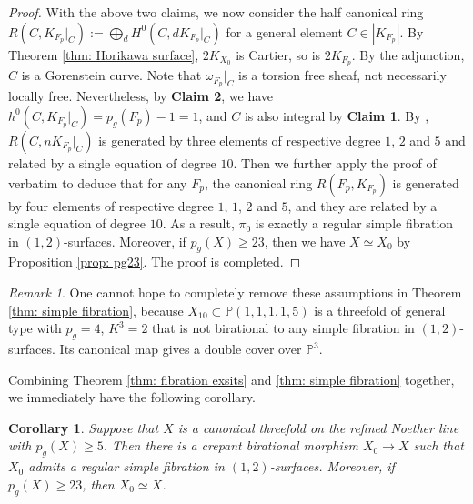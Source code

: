 \documentclass[a4paper,11pt]{amsart}
\newcommand{\PP}{\ensuremath{\mathbb{P}}}
\newtheorem{cor}[thm]{Corollary}
\theoremstyle{definition}
\theoremstyle{remark}
\newtheorem{remark}[thm]{Remark}
\numberwithin{equation}{section}
\begin{document}
\begin{proof}
	With the above two claims, we now consider the half canonical ring $R(C, K_{F_p}|_{C}) := \bigoplus_d H^0(C, dK_{F_p}|_C)$ for a general element $C \in |K_{F_p}|$. By Theorem \ref{thm: Horikawa surface}, $2K_{X_0}$ is Cartier, so is $2K_{F_p}$. By the adjunction, $C$ is a Gorenstein curve. Note that $\omega_{F_p}|_C$ is a torsion free sheaf, not necessarily locally free. Nevertheless, by \textbf{Claim 2}, we have $h^0(C, K_{F_p}|_C) = p_g(F_p) - 1 = 1$, and $C$ is also integral by \textbf{Claim 1}. By \cite[Theorem 5.2]{CFPR}, $R(C, nK_{F_p}|_{C})$ is generated by three elements of respective degree $1$, $2$ and $5$ and related by a single equation of degree $10$. Then we further apply the proof of \cite[Theorem 3.3 (1)]{FPRb} verbatim to deduce that for any $F_p$, the canonical ring $R(F_p, K_{F_p})$ is generated by four elements of respective degree $1$, $1$, $2$ and $5$, and they are related by a single equation of degree $10$. As a result, $\pi_0$ is exactly a regular simple fibration in $(1, 2)$-surfaces. Moreover, if $p_g(X) \ge 23$, then we have $X \simeq X_0$ by Proposition \ref{prop: pg23}. The proof is completed.
\end{proof}

\begin{remark}\label{rem: pg=4}
	One cannot hope to completely remove these assumptions in Theorem \ref{thm: simple fibration}, because $X_{10} \subset \PP(1,1,1,1,5)$ is a threefold of general type with $p_g=4$, $K^3=2$ that is not birational to any simple fibration in $(1,2)$-surfaces. Its canonical map gives a double cover over $\PP^3$.
\end{remark}

Combining Theorem \ref{thm: fibration exsits} and \ref{thm: simple fibration} together, we immediately have the following corollary.

\begin{cor}\label{cor: simple fibration}
	Suppose that $X$ is a canonical threefold on the refined Noether line with $p_g(X) \ge 5$. Then there is a crepant birational morphism $X_0 \to X$ such that $X_0$ admits a regular simple fibration in $(1,2)$-surfaces. Moreover, if $p_g(X) \ge 23$, then $X_0 \simeq X$.
\end{cor}

\end{document}
